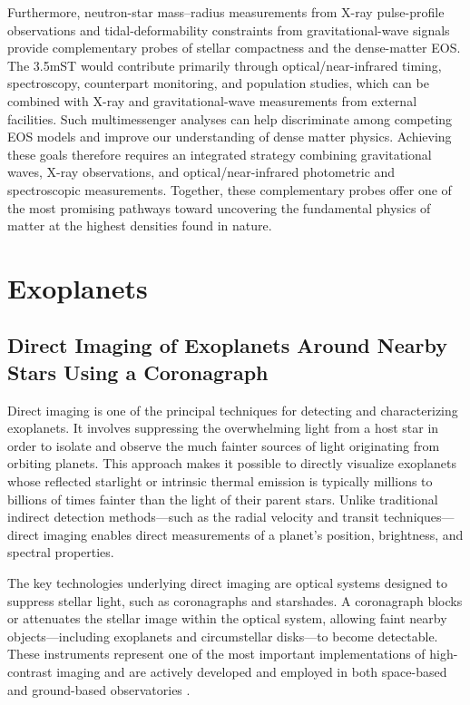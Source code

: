 Furthermore, neutron-star mass--radius measurements from X-ray pulse-profile observations and tidal-deformability constraints from gravitational-wave signals provide complementary probes of stellar compactness and the dense-matter EOS. The 3.5mST would contribute primarily through optical/near-infrared timing, spectroscopy, counterpart monitoring, and population studies, which can be combined with X-ray and gravitational-wave measurements from external facilities. Such multimessenger analyses can help discriminate among competing EOS models and improve our understanding of dense matter physics. Achieving these goals therefore requires an integrated strategy combining gravitational waves, X-ray observations, and optical/near-infrared photometric and spectroscopic measurements. Together, these complementary probes offer one of the most promising pathways toward uncovering the fundamental physics of matter at the highest densities found in nature.

\section{Exoplanets}\label{exoplanets}

\subsection{Direct Imaging of Exoplanets Around Nearby Stars Using a Coronagraph}\label{direct-imaging-of-exoplanets-around-nearby-stars-using-a-coronagraph}

Direct imaging is one of the principal techniques for detecting and characterizing exoplanets. It involves suppressing the overwhelming light from a host star in order to isolate and observe the much fainter sources of light originating from orbiting planets. This approach makes it possible to directly visualize exoplanets whose reflected starlight or intrinsic thermal emission is typically millions to billions of times fainter than the light of their parent stars. Unlike traditional indirect detection methods---such as the radial velocity and transit techniques---direct imaging enables direct measurements of a planet's position, brightness, and spectral properties.

The key technologies underlying direct imaging are optical systems designed to suppress stellar light, such as coronagraphs and starshades. A coronagraph blocks or attenuates the stellar image within the optical system, allowing faint nearby objects---including exoplanets and circumstellar disks---to become detectable. These instruments represent one of the most important implementations of high-contrast imaging and are actively developed and employed in both space-based and ground-based observatories \cite{galicher2023}.

